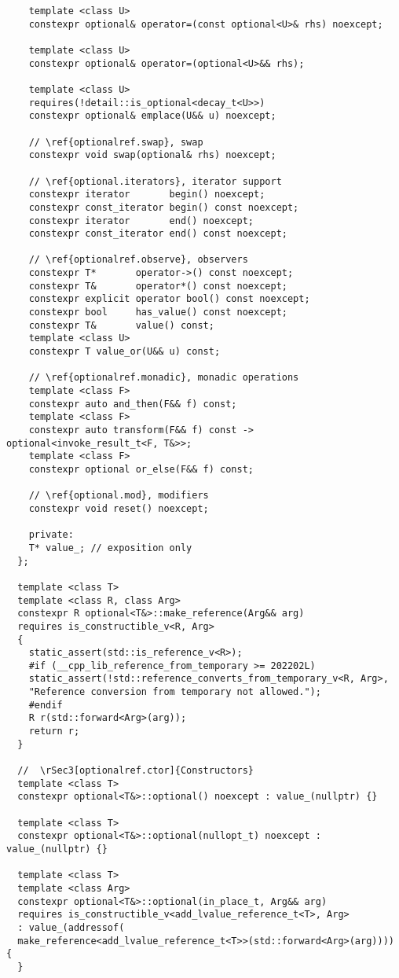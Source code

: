\documentclass[a4paper,10pt,oneside,openany,final,article]{memoir}
\begin{document}
\begin{verbatim}
    template <class U>
    constexpr optional& operator=(const optional<U>& rhs) noexcept;

    template <class U>
    constexpr optional& operator=(optional<U>&& rhs);

    template <class U>
    requires(!detail::is_optional<decay_t<U>>)
    constexpr optional& emplace(U&& u) noexcept;

    // \ref{optionalref.swap}, swap
    constexpr void swap(optional& rhs) noexcept;

    // \ref{optional.iterators}, iterator support
    constexpr iterator       begin() noexcept;
    constexpr const_iterator begin() const noexcept;
    constexpr iterator       end() noexcept;
    constexpr const_iterator end() const noexcept;

    // \ref{optionalref.observe}, observers
    constexpr T*       operator->() const noexcept;
    constexpr T&       operator*() const noexcept;
    constexpr explicit operator bool() const noexcept;
    constexpr bool     has_value() const noexcept;
    constexpr T&       value() const;
    template <class U>
    constexpr T value_or(U&& u) const;

    // \ref{optionalref.monadic}, monadic operations
    template <class F>
    constexpr auto and_then(F&& f) const;
    template <class F>
    constexpr auto transform(F&& f) const -> optional<invoke_result_t<F, T&>>;
    template <class F>
    constexpr optional or_else(F&& f) const;

    // \ref{optional.mod}, modifiers
    constexpr void reset() noexcept;

    private:
    T* value_; // exposition only
  };

  template <class T>
  template <class R, class Arg>
  constexpr R optional<T&>::make_reference(Arg&& arg)
  requires is_constructible_v<R, Arg>
  {
    static_assert(std::is_reference_v<R>);
    #if (__cpp_lib_reference_from_temporary >= 202202L)
    static_assert(!std::reference_converts_from_temporary_v<R, Arg>,
    "Reference conversion from temporary not allowed.");
    #endif
    R r(std::forward<Arg>(arg));
    return r;
  }

  //  \rSec3[optionalref.ctor]{Constructors}
  template <class T>
  constexpr optional<T&>::optional() noexcept : value_(nullptr) {}

  template <class T>
  constexpr optional<T&>::optional(nullopt_t) noexcept : value_(nullptr) {}

  template <class T>
  template <class Arg>
  constexpr optional<T&>::optional(in_place_t, Arg&& arg)
  requires is_constructible_v<add_lvalue_reference_t<T>, Arg>
  : value_(addressof(
  make_reference<add_lvalue_reference_t<T>>(std::forward<Arg>(arg)))) {
  }


\end{verbatim}
\end{document}
